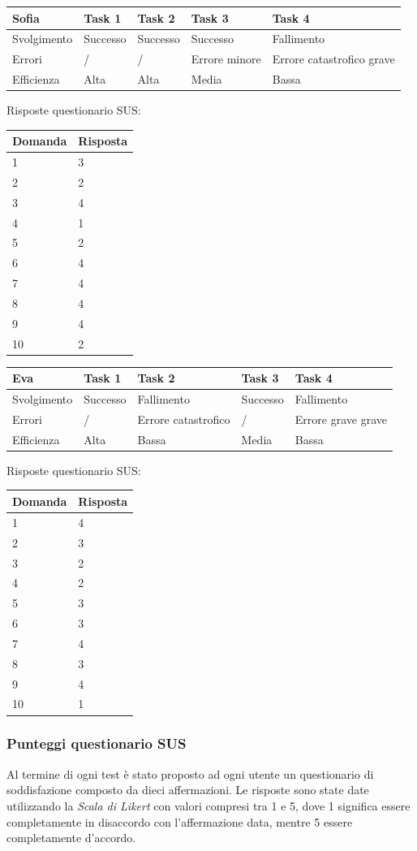 \documentclass[12pt,italian,]{report}
\begin{document}
\begin{longtable}[]{@{}lllll@{}}
\toprule
Sofia & Task 1 & Task 2 & Task 3 & Task 4\tabularnewline
\midrule
\endhead
Svolgimento & Successo & Successo & Successo & Fallimento\tabularnewline
Errori & / & / & Errore minore & Errore catastrofico
grave\tabularnewline
Efficienza & Alta & Alta & Media & Bassa\tabularnewline
\bottomrule
\end{longtable}

Risposte questionario SUS:

\begin{longtable}[]{@{}ll@{}}
\toprule
Domanda & Risposta\tabularnewline
\midrule
\endhead
1 & 3\tabularnewline
2 & 2\tabularnewline
3 & 4\tabularnewline
4 & 1\tabularnewline
5 & 2\tabularnewline
6 & 4\tabularnewline
7 & 4\tabularnewline
8 & 4\tabularnewline
9 & 4\tabularnewline
10 & 2\tabularnewline
\bottomrule
\end{longtable}

\begin{longtable}[]{@{}lllll@{}}
\toprule
Eva & Task 1 & Task 2 & Task 3 & Task 4\tabularnewline
\midrule
\endhead
Svolgimento & Successo & Fallimento & Successo & Fallimento\tabularnewline
Errori & / & Errore catastrofico & / & Errore grave
grave\tabularnewline
Efficienza & Alta & Bassa & Media & Bassa\tabularnewline
\bottomrule
\end{longtable}

Risposte questionario SUS:

\begin{longtable}[]{@{}ll@{}}
\toprule
Domanda & Risposta\tabularnewline
\midrule
\endhead
1 & 4\tabularnewline
2 & 3\tabularnewline
3 & 2\tabularnewline
4 & 2\tabularnewline
5 & 3\tabularnewline
6 & 3\tabularnewline
7 & 4\tabularnewline
8 & 3\tabularnewline
9 & 4\tabularnewline
10 & 1\tabularnewline
\bottomrule
\end{longtable}

\subsubsection{Punteggi questionario SUS}\label{punteggi-SUS}

Al termine di ogni test è stato proposto ad ogni utente un questionario di soddisfazione composto da dieci affermazioni. Le risposte sono state date utilizzando la \emph{Scala di Likert} con valori compresi tra 1 e 5, dove 1 significa essere completamente in disaccordo con l'affermazione data, mentre 5 essere completamente d'accordo.
\end{document}
